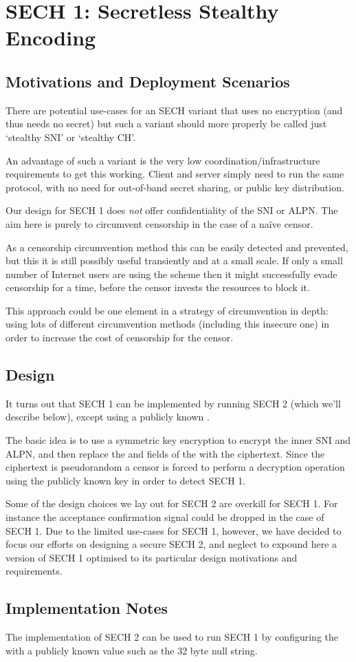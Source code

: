 \section{SECH 1: Secretless Stealthy Encoding}
\subsection{Motivations and Deployment Scenarios}

There are potential use-cases
for an \ac{SECH} variant
that uses no encryption (and thus
needs no secret)
but such a variant should more properly be called just `stealthy SNI' or `stealthy CH'.

An advantage of such a variant is the very low coordination/infrastructure requirements to get this working.
Client and server simply need to run the same
protocol, with no need for out-of-band secret sharing,
or public key distribution.

Our design for \ac{SECH} 1 does {\em not} offer confidentiality of the \ac{SNI} or \ac{ALPN}.
The aim here is purely to circumvent censorship
in the case of a naïve censor.

As a censorship circumvention method this can be easily detected and prevented, but this it is still possibly useful transiently and at a small scale.
If only a small number of Internet users are using the scheme
then it might successfully evade censorship for a time,
before the censor invests the resources to block it.

This approach could be one element in a strategy of circumvention in depth: using lots of different circumvention methods (including this insecure one) in order to increase the cost of censorship for the censor.

\subsection{Design}
It turns out that \ac{SECH} 1 can be implemented 
by running \ac{SECH} 2 (which we'll describe below),
except using a publicly known \varsechlongtermkey{}.

The basic idea is to use a symmetric key encryption to encrypt the
inner \ac{SNI} and \ac{ALPN}, and then replace the 
and \varlegacysessionid{} fields of the 
with the ciphertext. Since the ciphertext is pseudorandom
a censor is forced to perform a decryption operation using
the publicly known key in order to detect \ac{SECH} 1.

Some of the design choices we lay out for \ac{SECH} 2 are overkill
for \ac{SECH} 1.
For instance the acceptance confirmation signal
could be dropped in the case of \ac{SECH} 1.
Due to the limited use-cases for \ac{SECH} 1, however,
we have decided to focus our efforts on designing a secure
\ac{SECH} 2, and neglect to expound here a
version of \ac{SECH} 1 optimised to its particular
design motivations and requirements.

\subsection{Implementation Notes}
The implementation of \ac{SECH} 2 can be used to run \ac{SECH} 1
by configuring the \varsechlongtermkey{} with a publicly
known value such as the 32 byte null string.